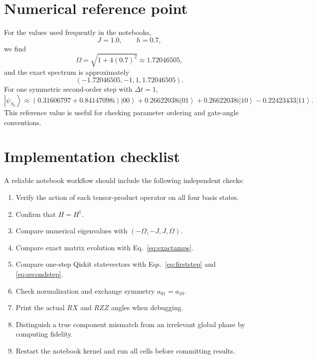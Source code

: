 \documentclass[11pt,a4paper]{article}
\newcommand{\ket}[1]{\left|#1\right\rangle}
\newcommand{\ii}{\mathrm{i}}
\begin{document}
\section{Numerical reference point}

For the values used frequently in the notebooks,
\begin{equation}
J=1.0,\qquad h=0.7,
\end{equation}
we find
\begin{equation}
\Omega=\sqrt{1+4(0.7)^2}\approx1.72046505,
\end{equation}
and the exact spectrum is approximately
\begin{equation}
(-1.72046505,-1,1,1.72046505).
\end{equation}
For one symmetric second-order step with $\Delta t=1$,
\begin{equation}
\ket{\psi_{S_2}}\approx
(0.31606797+0.84147098\ii)\ket{00}
+0.26622038\ii\ket{01}
+0.26622038\ii\ket{10}
-0.22423433\ket{11}.
\end{equation}
This reference value is useful for checking parameter ordering and gate-angle conventions.

\section{Implementation checklist}

A reliable notebook workflow should include the following independent checks:
\begin{enumerate}[leftmargin=1.5em]
\item Verify the action of each tensor-product operator on all four basis states.
\item Confirm that $H=H^\dagger$.
\item Compare numerical eigenvalues with $(-\Omega,-J,J,\Omega)$.
\item Compare exact matrix evolution with Eq.~\eqref{eq:exactamps}.
\item Compare one-step Qiskit statevectors with Eqs.~\eqref{eq:firststep} and \eqref{eq:secondstep}.
\item Check normalization and exchange symmetry $a_{01}=a_{10}$.
\item Print the actual $RX$ and $RZZ$ angles when debugging.
\item Distinguish a true component mismatch from an irrelevant global phase by computing fidelity.
\item Restart the notebook kernel and run all cells before committing results.
\end{enumerate}
\end{document}
